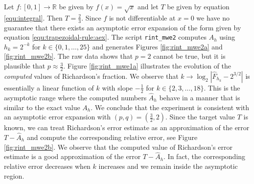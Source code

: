 \documentclass[runningheads]{llncs}
\begin{document}
Let $f : [0,1] \rightarrow \mathbb{R}$ be given by $f(x) = \sqrt{x}$ and let $T$ be given by equation \eqref{equ:integral}.
Then $T = \frac{2}{3}$. Since $f$ is not differentiable at $x=0$ we have no guarantee that there exists an asymptotic error expansion of the form given by equation \eqref{equ:trapezoidal-rule:aex}.
The script {\tt rint\_mwe2} computes $A_h$ using $h_k = 2^{-k}$ for $k \in \{0,1,\dots,25\}$ and generates Figures \ref{fig:rint_mwe2a} and \ref{fig:rint_mwe2b}.
The raw data shows that $p = 2$ cannot be true, but it is plausible that $p \approx \frac{3}{2}$.
Figure \ref{fig:rint_mwe1a} illustrates the evolution of the \emph{computed} values of Richardson's fraction.
We observe that $k \rightarrow \log_2|\hat{F}_{h_k} - 2^{3/2}|$ is essentially a linear function of $k$ with slope $-\frac{1}{2}$ for $k \in \{2,3,\dots,18\}$.
This is the asymptotic range where the computed numbers $\hat{A}_h$ behave in a manner that is similar to the exact value $A_h$. 
We conclude that the experiment is consistent with an asymptotic error expansion with $(p,q)=(\tfrac{3}{2},2)$.
Since the target value $T$ is known, we can treat Richardson's error estimate as an approximation of the error $T-\hat{A}_h$ and compute the corresponding relative error, see Figure \ref{fig:rint_mwe2b}.
We observe that the computed value of Richardson's error estimate is a good approximation of the error $T - \hat{A}_h$.
In fact, the corresponding relative error decreases when $k$ increases and we remain inside the asymptotic region.
\end{document}
